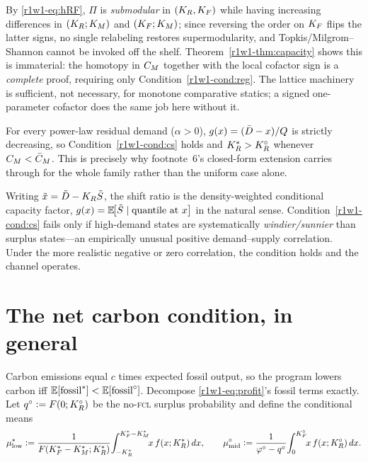 \begin{remark}\label{r1w1-rem:submod}
By \eqref{r1w1-eq:hRF}, $\Pi$ is \emph{submodular} in $(K_R,K_F)$ while having
increasing differences in $(K_R;K_M)$ and $(K_F;K_M)$; since reversing the order
on $K_F$ flips the latter signs, no single relabeling restores supermodularity,
and Topkis/Milgrom--Shannon cannot be invoked off the shelf. Theorem~\ref{r1w1-thm:capacity}
shows this is immaterial: the homotopy in $C_M$ together with the local cofactor
sign is a \emph{complete} proof, requiring only Condition~\ref{r1w1-cond:reg}. The
lattice machinery is sufficient, not necessary, for monotone comparative statics;
a signed one-parameter cofactor does the same job here without it.
\end{remark}

\begin{corollary}\label{r1w1-cor:power}
For every power-law residual demand ($\alpha>0$), $g(x)=(\bar D-x)/Q$ is strictly
decreasing, so Condition~\ref{r1w1-cond:cs} holds and $K_R^{*}>K_R^{\circ}$ whenever
$C_M<\bar C_M$. This is precisely why footnote~6's closed-form extension carries
through for the whole family rather than the uniform case alone.
\end{corollary}

\begin{remark}
Writing $\tilde x=\tilde D-K_R\tilde S$, the shift ratio is the
density-weighted conditional capacity factor,
$g(x)=\mathbb{E}\!\big[\tilde S \mid \text{quantile at }x\big]$ in the natural sense.
Condition~\ref{r1w1-cond:cs} fails only if high-demand states are systematically
\emph{windier/sunnier} than surplus states---an empirically unusual positive
demand--supply correlation. Under the more realistic negative or zero
correlation, the condition holds and the channel operates.
\end{remark}

\section{The net carbon condition, in general}\label{r1w1-sec:carbon}

Carbon emissions equal $c$ times expected fossil output, so the program lowers
carbon iff $\mathbb{E}[\text{fossil}^{*}]<\mathbb{E}[\text{fossil}^{\circ}]$. Decompose
\eqref{r1w1-eq:profit}'s fossil terms exactly. Let
$q^{\circ}\vcentcolon= F(0;K_R^{\circ})$ be the no-\textsc{fcl} surplus probability and define
the conditional means
\[
  \mu^{*}_{\mathrm{low}}\vcentcolon=
  \frac{1}{F(K_F^{*}-K_M^{*};K_R^{*})}\!\int_{-K_R^{*}}^{K_F^{*}-K_M^{*}}\!\!x\,f(x;K_R^{*})\,dx,
  \qquad
  \mu^{\circ}_{\mathrm{mid}}\vcentcolon=
  \frac{1}{\varphi^{\circ}-q^{\circ}}\!\int_{0}^{K_F^{\circ}}\!\!x\,f(x;K_R^{\circ})\,dx .
\]


